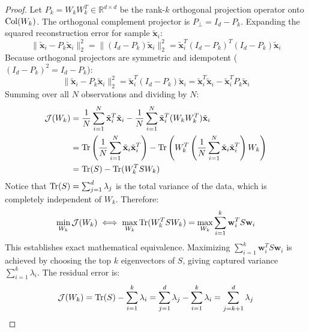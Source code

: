 \begin{proof}
Let $P_k = W_k W_k^T \in \mathbb{R}^{d \times d}$ be the rank-$k$ orthogonal projection operator onto $\operatorname{Col}(W_k)$. The orthogonal complement projector is $P_\perp = I_d - P_k$.
Expanding the squared reconstruction error for sample $\tilde{\mathbf{x}}_i$:
\begin{equation}
\|\tilde{\mathbf{x}}_i - P_k \tilde{\mathbf{x}}_i\|_2^2 = \|(I_d - P_k)\tilde{\mathbf{x}}_i\|_2^2 = \tilde{\mathbf{x}}_i^T (I_d - P_k)^T (I_d - P_k) \tilde{\mathbf{x}}_i
\end{equation}
Because orthogonal projectors are symmetric and idempotent ($(I_d - P_k)^2 = I_d - P_k$):
\begin{equation}
\|\tilde{\mathbf{x}}_i - P_k \tilde{\mathbf{x}}_i\|_2^2 = \tilde{\mathbf{x}}_i^T (I_d - P_k) \tilde{\mathbf{x}}_i = \tilde{\mathbf{x}}_i^T \tilde{\mathbf{x}}_i - \tilde{\mathbf{x}}_i^T P_k \tilde{\mathbf{x}}_i
\end{equation}
Summing over all $N$ observations and dividing by $N$:
\begin{align}
\mathcal{J}(W_k) &= \frac{1}{N}\sum_{i=1}^N \tilde{\mathbf{x}}_i^T \tilde{\mathbf{x}}_i - \frac{1}{N}\sum_{i=1}^N \tilde{\mathbf{x}}_i^T (W_k W_k^T) \tilde{\mathbf{x}}_i \notag \\
&= \operatorname{Tr}\left( \frac{1}{N}\sum_{i=1}^N \tilde{\mathbf{x}}_i \tilde{\mathbf{x}}_i^T \right) - \operatorname{Tr}\left( W_k^T \left( \frac{1}{N}\sum_{i=1}^N \tilde{\mathbf{x}}_i \tilde{\mathbf{x}}_i^T \right) W_k \right) \notag \\
&= \operatorname{Tr}(S) - \operatorname{Tr}(W_k^T S W_k)
\end{align}
Notice that $\operatorname{Tr}(S) = \sum_{j=1}^d \lambda_j$ is the total variance of the data, which is completely independent of $W_k$.
Therefore:
\begin{equation}
\min_{W_k} \mathcal{J}(W_k) \iff \max_{W_k} \operatorname{Tr}(W_k^T S W_k) = \max_{W_k} \sum_{i=1}^k \mathbf{w}_i^T S \mathbf{w}_i
\end{equation}
This establishes exact mathematical equivalence. Maximizing $\sum_{i=1}^k \mathbf{w}_i^T S \mathbf{w}_i$ is achieved by choosing the top $k$ eigenvectors of $S$, giving captured variance $\sum_{i=1}^k \lambda_i$.
The residual error is:
\begin{equation}
\mathcal{J}(W_k) = \operatorname{Tr}(S) - \sum_{i=1}^k \lambda_i = \sum_{j=1}^d \lambda_j - \sum_{i=1}^k \lambda_i = \sum_{j=k+1}^d \lambda_j
\end{equation}
\end{proof}

